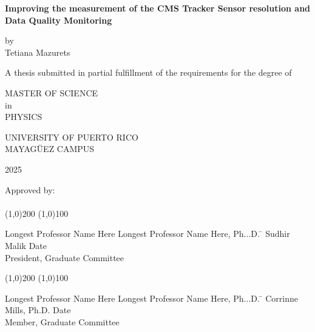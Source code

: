 



\thispagestyle{empty}
\begin{center}
	\begin{singlespace}
		\textbf{Improving the measurement of the CMS Tracker Sensor resolution and Data Quality Monitoring}
	\end{singlespace}
	\vspace{4 mm}
	by
	\\
	\vspace{4 mm}
	Tetiana Mazurets %
	\vspace{4 mm}
	\begin{singlespace}
		A thesis submitted in partial fulfillment of the requirements for the degree of %
	\end{singlespace}
	\vspace{4 mm}
	MASTER OF SCIENCE %
	\\
	in
	\\
	PHYSICS %
	\\
	\vspace{4 mm}
	\begin{singlespace}

		UNIVERSITY OF PUERTO RICO
		\\
		MAYAG\"UEZ CAMPUS
	\end{singlespace}

	2025 %
\end{center}
\bigskip
\bigskip
\bigskip
\bigskip
\bigskip
\bigskip
\bigskip

\noindent Approved by:
\\
\\

\noindent
\line(1,0){200} \hspace{40 mm} \line(1,0){100}\\
\noindent
\vspace{-1.75\baselineskip}
\begin{tabbing}
	Longest Professor Name Here Longest Professor Name Here, Ph...D. \=  \kill
	Sudhir Malik \>  Date\\President, Graduate Committee  %
\end{tabbing}



\noindent
\line(1,0){200} \hspace{40 mm} \line(1,0){100}\\
\noindent
\vspace{-1.75\baselineskip}
\begin{tabbing}
	Longest Professor Name Here Longest Professor Name Here, Ph...D. \=  \kill
	Corrinne Mills, Ph.D. \>  Date\\Member, Graduate Committee  %
\end{tabbing}

